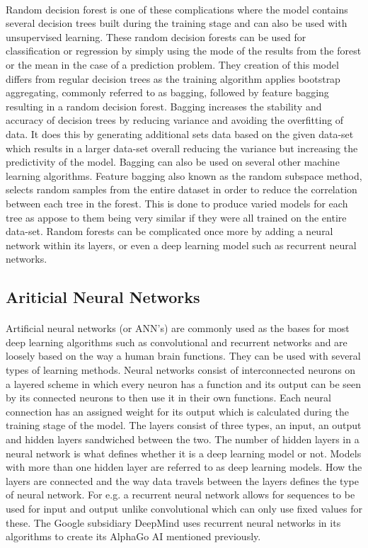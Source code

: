 \paragraph{}Random decision forest is one of these complications where the model contains several decision trees built during the training stage and can also be used with unsupervised learning. These random decision forests can be used for classification or regression by simply using the mode of the results from the forest or the mean in the case of a prediction problem. They creation of this model differs from regular decision trees as the training algorithm applies bootstrap aggregating, commonly referred to as bagging, followed by feature bagging resulting in a random decision forest. Bagging increases the stability and accuracy of decision trees by reducing variance and avoiding the overfitting of data. It does this by generating additional sets data based on the given data-set which results in a larger data-set overall reducing the variance but increasing the predictivity of the model. Bagging can also be used on several other machine learning algorithms. Feature bagging also known as the random subspace method, selects random samples from the entire dataset in order to reduce the correlation between each tree in the forest. This is done to produce varied models for each tree as appose to them being very similar if they were all trained on the entire data-set. Random forests can be complicated once more by adding a neural network within its layers, or even a deep learning model such as recurrent neural networks.
\subsection{Ariticial Neural Networks} 
\paragraph{}Artificial neural networks (or ANN’s) are commonly used as the bases for most deep learning algorithms such as convolutional and recurrent networks and are loosely based on the way a human brain functions. They can be used with several types of learning methods. Neural networks consist of interconnected neurons on a layered scheme in which every neuron has a function and its output can be seen by its connected neurons to then use it in their own functions. Each neural connection has an assigned weight for its output which is calculated during the training stage of the model. The layers consist of three types, an input, an output and hidden layers sandwiched between the two. The number of hidden layers in a neural network is what defines whether it is a deep learning model or not. Models with more than one hidden layer are referred to as deep learning models. How the layers are connected and the way data travels between the layers defines the type of neural network. For e.g. a recurrent neural network allows for sequences to be used for input and output unlike convolutional which can only use fixed values for these. The Google subsidiary DeepMind uses recurrent neural networks in its algorithms to create its AlphaGo AI mentioned previously.

